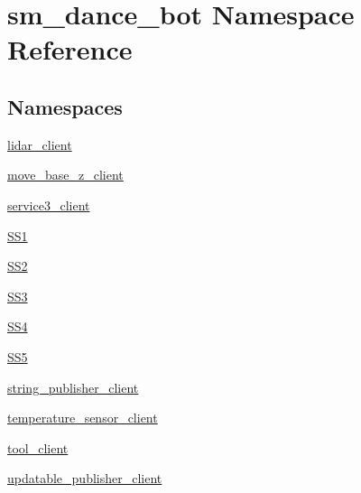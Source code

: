 \hypertarget{namespacesm__dance__bot}{}\section{sm\+\_\+dance\+\_\+bot Namespace Reference}
\label{namespacesm__dance__bot}
\subsection*{Namespaces}
\begin{DoxyCompactItemize}
\item 
 \hyperlink{namespacesm__dance__bot_1_1lidar__client}{lidar\+\_\+client}
\item 
 \hyperlink{namespacesm__dance__bot_1_1move__base__z__client}{move\+\_\+base\+\_\+z\+\_\+client}
\item 
 \hyperlink{namespacesm__dance__bot_1_1service3__client}{service3\+\_\+client}
\item 
 \hyperlink{namespacesm__dance__bot_1_1SS1}{S\+S1}
\item 
 \hyperlink{namespacesm__dance__bot_1_1SS2}{S\+S2}
\item 
 \hyperlink{namespacesm__dance__bot_1_1SS3}{S\+S3}
\item 
 \hyperlink{namespacesm__dance__bot_1_1SS4}{S\+S4}
\item 
 \hyperlink{namespacesm__dance__bot_1_1SS5}{S\+S5}
\item 
 \hyperlink{namespacesm__dance__bot_1_1string__publisher__client}{string\+\_\+publisher\+\_\+client}
\item 
 \hyperlink{namespacesm__dance__bot_1_1temperature__sensor__client}{temperature\+\_\+sensor\+\_\+client}
\item 
 \hyperlink{namespacesm__dance__bot_1_1tool__client}{tool\+\_\+client}
\item 
 \hyperlink{namespacesm__dance__bot_1_1updatable__publisher__client}{updatable\+\_\+publisher\+\_\+client}
\end{DoxyCompactItemize}

